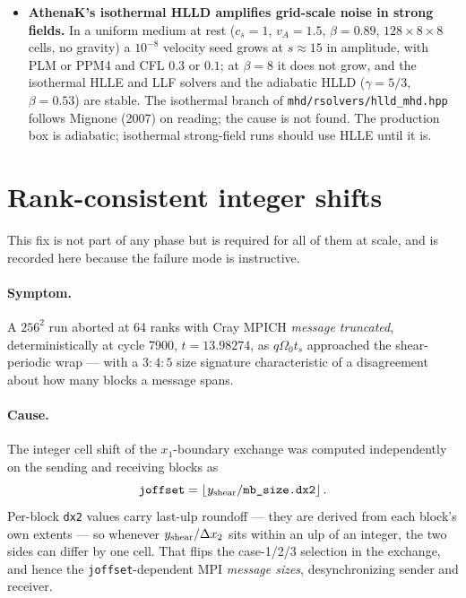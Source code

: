 \documentclass[11pt]{article}
\newcommand{\code}[1]{\texttt{#1}}
\newcommand{\file}[1]{\texttt{\small #1}}
\newcommand{\Om}{\Omega_0}
\begin{document}
\begin{itemize}
      implemented, and a 2-D $x$--$y$ input runs silently with plain periodic $x_1$
      boundaries; a guard would make it fatal.
\item \textbf{AthenaK's isothermal HLLD amplifies grid-scale noise in strong fields.} In a
      uniform medium at rest ($c_s = 1$, $v_A = 1.5$, $\beta = 0.89$, $128\times8\times8$
      cells, no gravity) a $10^{-8}$ velocity seed grows at $s \approx 15$ in amplitude,
      with PLM or PPM4 and CFL $0.3$ or $0.1$; at $\beta = 8$ it does not grow, and the
      isothermal HLLE and LLF solvers and the adiabatic HLLD ($\gamma = 5/3$,
      $\beta = 0.53$) are stable. The isothermal branch of \file{mhd/rsolvers/hlld\_mhd.hpp}
      follows Mignone (2007) on reading; the cause is not found. The production box is
      adiabatic; isothermal strong-field runs should use HLLE until it is.
\end{itemize}

\section{Rank-consistent integer shifts}
\label{sec:consistentdx2}

This fix is not part of any phase but is required for all of them at scale, and is
recorded here because the failure mode is instructive.

\paragraph{Symptom.} A $256^2$ run aborted at 64 ranks with Cray MPICH
\emph{message truncated}, deterministically at cycle 7900, $t = 13.98274$, as
$q\Om t_s$ approached the shear-periodic wrap --- with a $3{:}4{:}5$ size signature
characteristic of a disagreement about how many blocks a message spans.

\paragraph{Cause.} The integer cell shift of the $x_1$-boundary exchange was computed
independently on the sending and receiving blocks as
\begin{equation}
  \code{joffset} = \left\lfloor y_{\rm shear} / \code{mb\_size.dx2} \right\rfloor .
\end{equation}
Per-block \code{dx2} values carry last-ulp roundoff --- they are derived from each
block's own extents --- so whenever $y_{\rm shear}/\Delta x_2$ sits within an ulp of an
integer, the two sides can differ by one cell. That flips the case-1/2/3 selection in
the exchange, and hence the \code{joffset}-dependent MPI \emph{message sizes},
desynchronizing sender and receiver.
\end{document}
